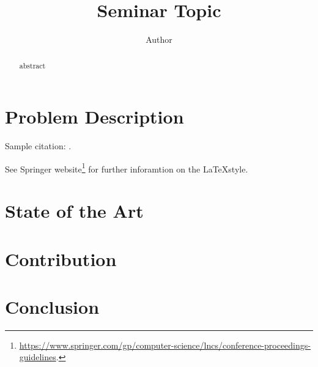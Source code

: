 \documentclass[runningheads]{llncs}
\begin{document}
%
\title{Seminar Topic}
%
%
\author{Author}
%
%
%
\maketitle              %
%
\begin{abstract}
abstract
\end{abstract}
%
%
%
\section{Problem Description}

Sample citation: \cite{gelman2013bayesian}.

See Springer website\footnote{\url{https://www.springer.com/gp/computer-science/lncs/conference-proceedings-guidelines}.} for further inforamtion on the \LaTeX style.
\section{State of the Art}


\section{Contribution}

\section{Conclusion}

%
%
%


\end{document}
